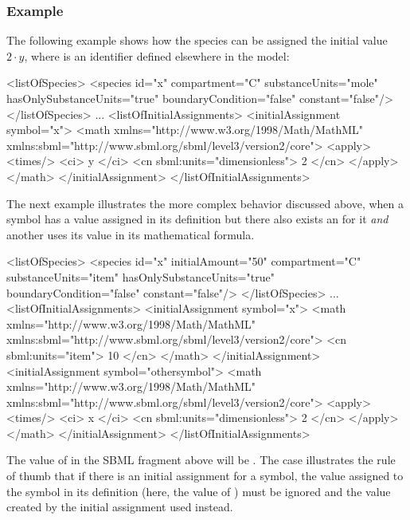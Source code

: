 \subsubsection{Example}

The following example shows how the species  can be
assigned the initial value $2 \cdot y$, where  is an
identifier defined elsewhere in the model:

\begin{example}
<listOfSpecies>
    <species id="x" compartment="C" substanceUnits="mole"
             hasOnlySubstanceUnits="true" boundaryCondition="false" 
             constant="false"/>
</listOfSpecies>
...
<listOfInitialAssignments>
    <initialAssignment symbol="x">
        <math xmlns="http://www.w3.org/1998/Math/MathML"
              xmlns:sbml="http://www.sbml.org/sbml/level3/version2/core">
            <apply>
                <times/> 
                <ci> y </ci> 
                <cn sbml:units="dimensionless"> 2 </cn>
            </apply>
        </math>
    </initialAssignment>
</listOfInitialAssignments>
\end{example}

The next example illustrates the more complex behavior discussed
above, when a symbol has a value assigned in its definition but
there also exists an \InitialAssignment for it \emph{and} another
\InitialAssignment uses its value in its mathematical formula.

\begin{example}
<listOfSpecies>
    <species id="x" initialAmount="50" compartment="C" substanceUnits="item"
             hasOnlySubstanceUnits="true" boundaryCondition="false" constant="false"/>
</listOfSpecies>
...
<listOfInitialAssignments>
    <initialAssignment symbol="x">
        <math xmlns="http://www.w3.org/1998/Math/MathML"
              xmlns:sbml="http://www.sbml.org/sbml/level3/version2/core">
            <cn sbml:units="item"> 10 </cn>
        </math>
    </initialAssignment>
    <initialAssignment symbol="othersymbol">
        <math xmlns="http://www.w3.org/1998/Math/MathML"
              xmlns:sbml="http://www.sbml.org/sbml/level3/version2/core">
            <apply>
                <times/>
                <ci> x </ci>
                <cn sbml:units="dimensionless"> 2 </cn>
            </apply>
        </math>
    </initialAssignment>
</listOfInitialAssignments>
\end{example}

The value of  in the SBML fragment above will be
.  The case illustrates the rule of thumb that if there is
an initial assignment for a symbol, the value assigned to the
symbol in its definition (here, the value of
) must be ignored and the value created by
the initial assignment used instead.


